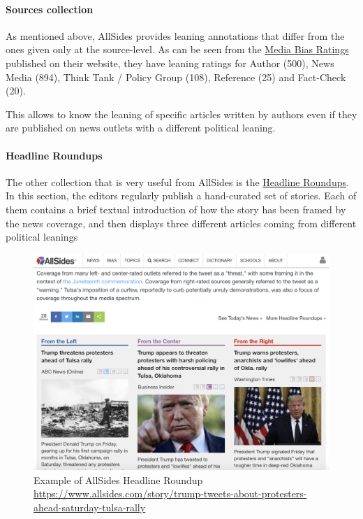 \paragraph{Sources collection}

As mentioned above, AllSides provides leaning annotations that differ from  the ones given only at the source-level.
As can be seen from the \href{https://www.allsides.com/media-bias/ratings}{Media Bias Ratings} published on their website, they have leaning ratings for Author (500), News Media (894), Think Tank / Policy Group (108), Reference (25) and Fact-Check (20).

This allows to know the leaning of specific articles written by authors even if they are published on news outlets with a different political leaning. 

\paragraph{Headline Roundups\texttrademark}

The other collection that is very useful from AllSides is the \href{https://www.allsides.com/headline-roundups}{Headline Roundups\texttrademark}. In this section, the editors regularly publish a hand-curated set of stories. Each of them contains a brief textual introduction of how the story has been framed by the news coverage, and then displays three different articles coming from different political leanings


\begin{figure}[!htb]
    \centering
    \includegraphics[width=\linewidth]{figures/allsides.png}
    \caption{Example of AllSides Headline Roundup \url{https://www.allsides.com/story/trump-tweets-about-protesters-ahead-saturday-tulsa-rally}}
    \label{fig:allsides}
\end{figure}

